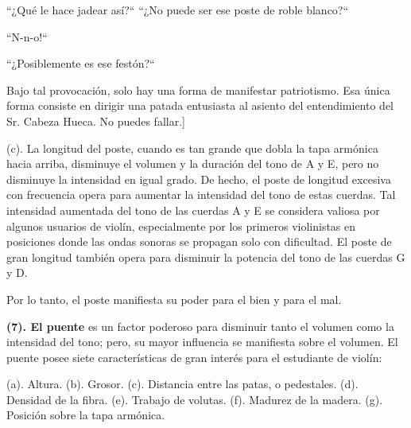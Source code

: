 \documentclass[12pt]{book}
\begin{document}
``¿Qué le hace jadear así?`` ``¿No puede ser ese poste de roble blanco?``

``N-n-o!``

``¿Posiblemente es ese festón?``

Bajo tal provocación, solo hay una forma de manifestar patriotismo. Esa única forma consiste en dirigir una patada entusiasta al asiento del entendimiento del Sr. Cabeza Hueca. No puedes fallar.]

(c). La longitud del poste, cuando es tan grande que dobla la tapa armónica hacia arriba, disminuye el volumen y la duración del tono de A y E, pero no disminuye la intensidad en igual grado. De hecho, el poste de longitud excesiva con frecuencia opera para aumentar la intensidad del tono de estas cuerdas. Tal intensidad aumentada del tono de las cuerdas A y E se considera valiosa por algunos usuarios de violín, especialmente por los primeros violinistas en posiciones donde las ondas sonoras se propagan solo con dificultad. El poste de gran longitud también opera para disminuir la potencia del tono de las cuerdas G y D.

Por lo tanto, el poste manifiesta su poder para el bien y para el mal.

\textbf{(7). El puente} es un factor poderoso para disminuir tanto el volumen como la intensidad del tono; pero, su mayor influencia se manifiesta sobre el volumen. El puente posee siete características de gran interés para el estudiante de violín:

(a). Altura. (b). Grosor. (c). Distancia entre las patas, o pedestales. (d). Densidad de la fibra. (e). Trabajo de volutas. (f). Madurez de la madera. (g). Posición sobre la tapa armónica.
\end{document}
